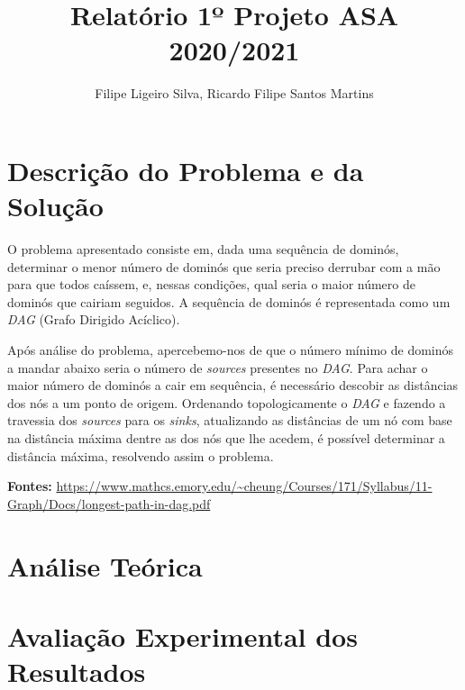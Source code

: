\documentclass[a4paper, 12pt]{article}
\author{Filipe Ligeiro Silva, Ricardo Filipe Santos Martins}
\title{Relatório 1º Projeto ASA 2020/2021}
\date{}
\begin{document}
\section*{Descrição do Problema e da Solução}
O problema apresentado consiste em, dada uma sequência de dominós, determinar o
menor número de dominós que seria preciso derrubar com a mão para que todos
caíssem, e, nessas condições, qual seria o maior número de dominós que cairiam
seguidos. A sequência de dominós é representada como um \textit{DAG} (Grafo
Dirigido Acíclico).

Após análise do problema, apercebemo-nos de que o número mínimo de dominós a
mandar abaixo seria o número de \textit{sources} presentes no \textit{DAG}.
Para achar o maior número de dominós a cair em sequência, é necessário descobir
as distâncias dos nós a um ponto de origem. Ordenando topologicamente o
\textit{DAG} e fazendo a travessia dos \textit{sources} para os \textit{sinks},
atualizando as distâncias de um nó com base na distância máxima dentre as dos
nós que lhe acedem, é possível determinar a distância máxima, resolvendo assim
o problema.

\textbf{Fontes: }
\url{https://www.mathcs.emory.edu/~cheung/Courses/171/Syllabus/11-Graph/Docs/longest-path-in-dag.pdf}
\section*{Análise Teórica}
\section*{Avaliação Experimental dos Resultados}
\end{document}
